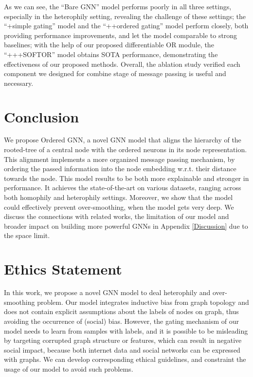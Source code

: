 \documentclass{article}
\begin{document}
As we can see, the ``Bare GNN'' model performs poorly in all three settings, especially in the heterophily setting, revealing the challenge of these settings; the ``+simple gating'' model and the ``++ordered gating'' model perform closely, both providing performance improvements, and let the model comparable to strong baselines; with the help of our proposed differentiable OR module, the ``+++SOFTOR'' model obtains SOTA performance, demonstrating the effectiveness of our proposed methods. Overall, the ablation study verified each component we designed for combine stage of message passing is useful and necessary.


\section{Conclusion}
We propose Ordered GNN, a novel GNN model that aligns the hierarchy of the rooted-tree of a central node with the ordered neurons in its node representation. This alignment implements a more organized message passing mechanism, by ordering the passed information into the node embedding w.r.t. their distance towards the node. This model results to be both more explainable and stronger in performance. It achieves the state-of-the-art on various datasets, ranging across both homophily and heterophily settings. Moreover, we show that the model could effectively prevent over-smoothing, when the model gets very deep. We discuss the connections with related works, the limitation of our model and broader impact on building more powerful GNNs in Appendix \ref{Discussion} due to the space limit.


\section{Ethics Statement}
In this work, we propose a novel GNN model to deal heterophily and over-smoothing problem. Our model integrates inductive bias from graph topology and does not contain explicit assumptions about the labels of nodes on graph, thus avoiding the occurrence of (social) bias. However, the gating mechanism of our model needs to learn from samples with labels, and it is possible to be misleading by targeting corrupted graph structure or features, which can result in negative social impact, because both internet data and social networks can be expressed with graphs. We can develop corresponding ethical guidelines, and constraint the usage of our model to avoid such problems.
\end{document}
